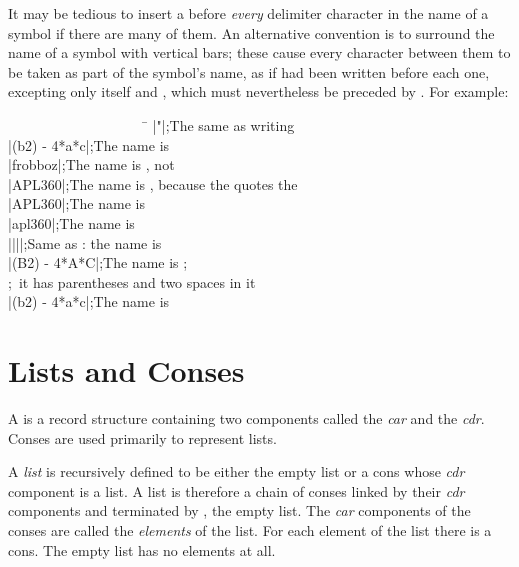 It may be tedious to insert a \cd{{\Xbackslash}} before \emph{every} delimiter
character in the name of a symbol if there are many of them.
An alternative convention is to surround the name of a symbol
with vertical bars; these cause every character between them to
be taken as part of the symbol's name, as if \cd{{\Xbackslash}} had been written
before each one, excepting only
\cd{|} itself and \cd{{\Xbackslash}}, which must nevertheless be preceded by \cd{{\Xbackslash}}.
For example:
\begin{lisp}
~~~~~~~~~~~~~~~~~~~~\=\kill
|"|\>;{\rm The same as writing } \\
|(b{\Xcircumflex}2) - 4*a*c|\>;{\rm The name is } \\
|frobboz|\>;{\rm The name is , not } \\
|APL{\Xbackslash}360|\>;{\rm The name is , because the \cd{{\Xbackslash}} quotes the } \\
|APL{\Xbackslash}{\Xbackslash}360|\>;{\rm The name is } \\
|apl{\Xbackslash}{\Xbackslash}360|\>;{\rm The name is } \\
|{\Xbackslash}|{\Xbackslash}||\>;{\rm Same as \cd{{\Xbackslash}|{\Xbackslash}|}: the name is \cd{||}} \\
|(B{\Xcircumflex}2) - 4*A*C|\>;{\rm The name is ;} \\
\>;~{\rm it has parentheses and two spaces in it} \\
|(b{\Xcircumflex}2) - 4*a*c|\>;{\rm The name is }
\end{lisp}

\section{Lists and Conses}

A  is a record structure containing two components
called the \emph{car} and the \emph{cdr}.  Conses are used primarily
to represent lists.

A \emph{list} is recursively defined to be either the empty list
or a cons whose \emph{cdr} component is a list.
A list is therefore a chain of conses linked by their \emph{cdr} components
and terminated by {\nil}, the empty list.  The \emph{car} components of the conses
are called the \emph{elements} of the list.  For each element of the list
there is a cons.  The empty list has no elements at all.


